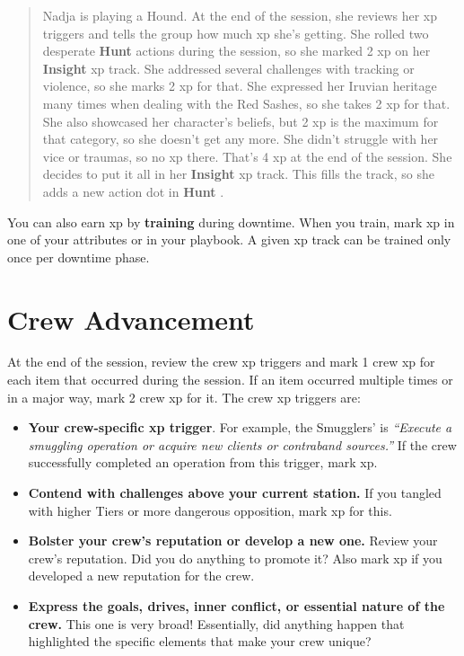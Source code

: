 \documentclass[11pt,oneside]{book}
\newcommand{\gameterm}[1]{\textbf{#1}}
\begin{document}
\begin{quote}
	Nadja is playing a Hound. At the end of the session, she reviews her xp triggers and tells the group how much xp she’s getting. She rolled two desperate \gameterm{Hunt}  actions during the session, so she marked 2 xp on her \gameterm{Insight}  xp track. She addressed several challenges with tracking or violence, so she marks 2 xp for that. She expressed her Iruvian heritage many times when dealing with the Red Sashes, so she takes 2 xp for that. She also showcased her character’s beliefs, but 2 xp is the maximum for that category, so she doesn’t get any more. She didn’t struggle with her vice or traumas, so no xp there. That’s 4 xp at the end of the session. She decides to put it all in her \gameterm{Insight}  xp track. This fills the track, so she adds a new action dot in \gameterm{Hunt} .
\end{quote}

You can also earn xp by \textbf{training} during downtime. When you train, mark xp in one of your attributes or in your playbook. A given xp track can be trained only once per downtime phase.

\section{Crew Advancement}

At the end of the session, review the crew xp triggers and mark 1 crew xp for each item that occurred during the session. If an item occurred multiple times or in a major way, mark 2 crew xp for it. The crew xp triggers are:

\begin{itemize}
	\item \textbf{Your crew-specific xp trigger}. For example, the Smugglers’ is \emph{“Execute a smuggling operation or acquire new clients or contraband sources.”} If the crew successfully completed an operation from this trigger, mark xp.
	\item \textbf{Contend with challenges above your current station.} If you tangled with higher Tiers or more dangerous opposition, mark xp for this.
	\item \textbf{Bolster your crew’s reputation or develop a new one.} Review your crew’s reputation. Did you do anything to promote it? Also mark xp if you developed a new reputation for the crew.
	\item \textbf{Express the goals, drives, inner conflict, or essential nature of the crew.} This one is very broad! Essentially, did anything happen that highlighted the specific elements that make your crew unique?
\end{itemize}
\end{document}
